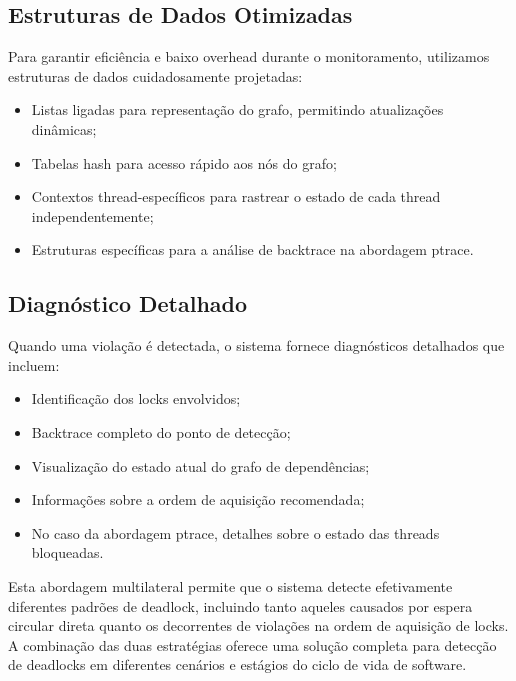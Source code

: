 \subsection{Estruturas de Dados Otimizadas}

Para garantir eficiência e baixo overhead durante o monitoramento, utilizamos estruturas de dados cuidadosamente projetadas:

\begin{itemize}
    \item Listas ligadas para representação do grafo, permitindo atualizações dinâmicas;
    \item Tabelas hash para acesso rápido aos nós do grafo;
    \item Contextos thread-específicos para rastrear o estado de cada thread independentemente;
    \item Estruturas específicas para a análise de backtrace na abordagem ptrace.
\end{itemize}

\subsection{Diagnóstico Detalhado}

Quando uma violação é detectada, o sistema fornece diagnósticos detalhados que incluem:

\begin{itemize}
    \item Identificação dos locks envolvidos;
    \item Backtrace completo do ponto de detecção;
    \item Visualização do estado atual do grafo de dependências;
    \item Informações sobre a ordem de aquisição recomendada;
    \item No caso da abordagem ptrace, detalhes sobre o estado das threads bloqueadas.
\end{itemize}

Esta abordagem multilateral permite que o sistema detecte efetivamente diferentes padrões de deadlock, incluindo tanto aqueles causados por espera circular direta quanto os decorrentes de violações na ordem de aquisição de locks. A combinação das duas estratégias oferece uma solução completa para detecção de deadlocks em diferentes cenários e estágios do ciclo de vida de software.
